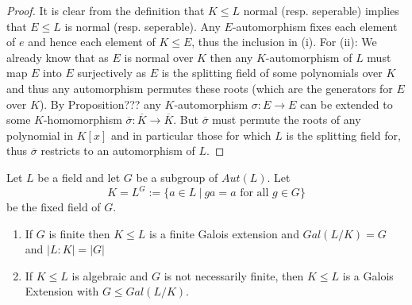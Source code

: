 \documentclass[twoside, a4paper, 10pt]{amsart}
\begin{document}
\begin{proof} It is clear from the definition that $K \leq L$ normal (resp. seperable) implies that $E \leq L$ is normal (resp. seperable). Any $E$-automorphism fixes each element of $e$ and hence each element of $K \leq E$, thus the inclusion in (i). For (ii): We already know that as $E$ is normal over $K$ then any $K$-automorphism of $L$ must map $E$ into $E$ surjectively as $E$ is the splitting field of some polynomials over $K$ and thus any automorphism permutes these roots (which are the generators for $E$ over $K$). By Proposition??? any $K$-automorphism $\sigma:E \to E$ can be extended to some $K$-homomorphism $\overline{\sigma}:\overline{K} \to \overline{K}$. But $\overline{\sigma}$ must permute the roots of any polynomial in $K[x]$ and in particular those for which $L$ is the splitting field for, thus $\overline{\sigma}$ restricts to an automorphism of $L$. \end{proof}

\begin{prop}\label{prop: fixed field galois group} Let $L$ be a field and let $G$ be a subgroup of $Aut(L)$. Let $$K=L^G:= \{a \in L ~|~ ga = a \text{ for all } g \in G\}$$ be the fixed field of $G$. 
\begin{enumerate}
	\item If $G$ is finite then $K \leq L$ is a finite Galois extension and $Gal(L/K) = G$ and $|L:K| = |G|$
	\item If $K \leq L$ is algebraic and $G$ is not necessarily finite, then $K \leq L$ is a Galois Extension with $G \leq Gal(L/K)$. 
\end{enumerate}

\end{prop}
\end{document}
